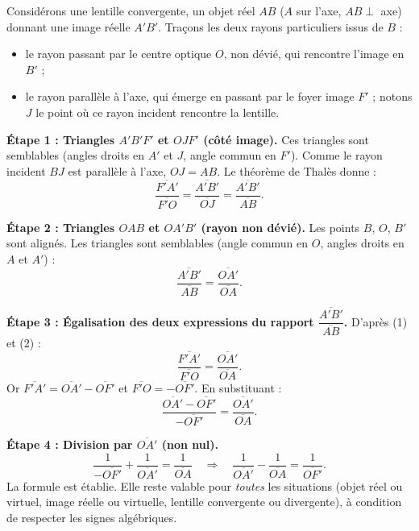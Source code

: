 \documentclass[11pt]{article}
\begin{document}
\begin{experience}
Considérons une lentille convergente, un objet réel $AB$ ($A$ sur l'axe, $AB \perp$ axe) donnant une image réelle $A'B'$. Traçons les deux rayons particuliers issus de $B$ :
\begin{itemize}
\item le rayon passant par le centre optique $O$, non dévié, qui rencontre l'image en $B'$ ;
\item le rayon parallèle à l'axe, qui émerge en passant par le foyer image $F'$ ; notons $J$ le point où ce rayon incident rencontre la lentille.
\end{itemize}

\textbf{Étape 1 : Triangles $A'B'F'$ et $OJF'$ (côté image).} Ces triangles sont semblables (angles droits en $A'$ et $J$, angle commun en $F'$). Comme le rayon incident $BJ$ est parallèle à l'axe, $OJ = AB$. Le théorème de Thalès donne :
\[ \frac{\overline{F'A'}}{\overline{F'O}} = \frac{\overline{A'B'}}{\overline{OJ}} = \frac{\overline{A'B'}}{\overline{AB}}. \tag{1} \]

\textbf{Étape 2 : Triangles $OAB$ et $OA'B'$ (rayon non dévié).} Les points $B$, $O$, $B'$ sont alignés. Les triangles sont semblables (angle commun en $O$, angles droits en $A$ et $A'$) :
\[ \frac{\overline{A'B'}}{\overline{AB}} = \frac{\overline{OA'}}{\overline{OA}}. \tag{2} \]

\textbf{Étape 3 : Égalisation des deux expressions du rapport $\dfrac{\overline{A'B'}}{\overline{AB}}$.} D'après (1) et (2) :
\[ \frac{\overline{F'A'}}{\overline{F'O}} = \frac{\overline{OA'}}{\overline{OA}}. \]
Or $\overline{F'A'} = \overline{OA'} - \overline{OF'}$ et $\overline{F'O} = -\overline{OF'}$. En substituant :
\[ \frac{\overline{OA'} - \overline{OF'}}{-\overline{OF'}} = \frac{\overline{OA'}}{\overline{OA}}. \]

\textbf{Étape 4 : Division par $\overline{OA'}$ (non nul).}
\[ \frac{1}{-\overline{OF'}} + \frac{1}{\overline{OA'}} = \frac{1}{\overline{OA}} \quad\Longrightarrow\quad \frac{1}{\overline{OA'}} - \frac{1}{\overline{OA}} = \frac{1}{\overline{OF'}}. \]
La formule est établie. Elle reste valable pour \emph{toutes} les situations (objet réel ou virtuel, image réelle ou virtuelle, lentille convergente ou divergente), à condition de respecter les signes algébriques.
\end{experience}
\end{document}
